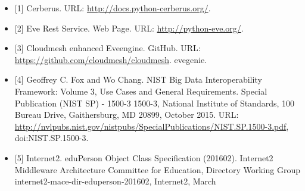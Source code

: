 \documentclass[9pt,]{article}
\begin{document}
\begin{itemize}
\item
  {[}1{]} Cerberus. URL: \url{http://docs.python-cerberus.org/}.
\item
  {[}2{]} Eve Rest Service. Web Page. URL: \url{http://python-eve.org/}.
\item
  {[}3{]} Cloudmesh enhanced Eveengine. GitHub. URL:
  \url{https://github.com/cloudmesh/cloudmesh}. evegenie.
\item
  {[}4{]} Geoffrey C. Fox and Wo Chang. NIST Big Data Interoperability
  Framework: Volume 3, Use Cases and General Requirements. Special
  Publication (NIST SP) - 1500-3 1500-3, National Institute of
  Standards, 100 Bureau Drive, Gaithersburg, MD 20899, October 2015.
  URL:
  \url{http://nvlpubs.nist.gov/nistpubs/SpecialPublications/NIST.SP.1500-3.pdf},
  doi:NIST.SP.1500-3.
\item
  {[}5{]} Internet2. eduPerson Object Class Specification (201602).
  Internet2 Middleware Architecture Committee for Education, Directory
  Working Group internet2-mace-dir-eduperson-201602, Internet2, March


\end{itemize}
\end{document}
